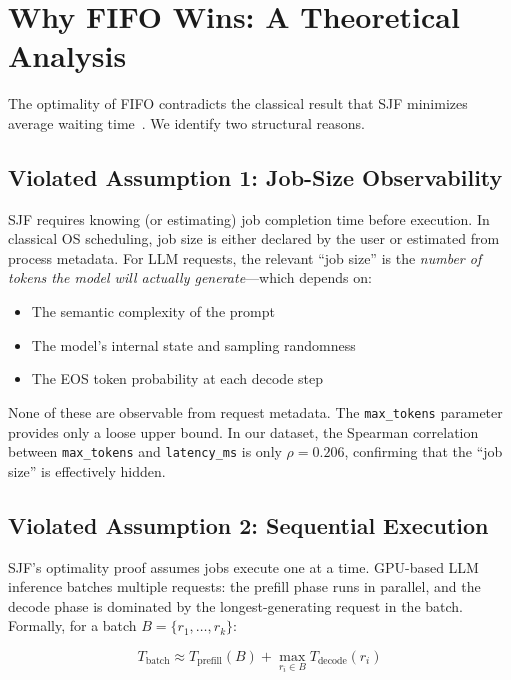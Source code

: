 \documentclass[conference]{IEEEtran}
\begin{document}
\section{Why FIFO Wins: A Theoretical Analysis}
\label{sec:why_fifo}

The optimality of FIFO contradicts the classical result that SJF minimizes average waiting time~\cite{liu1973scheduling}. We identify two structural reasons.

\subsection{Violated Assumption 1: Job-Size Observability}

SJF requires knowing (or estimating) job completion time before execution. In classical OS scheduling, job size is either declared by the user or estimated from process metadata. For LLM requests, the relevant ``job size'' is the \textit{number of tokens the model will actually generate}---which depends on:

\begin{itemize}
    \item The semantic complexity of the prompt
    \item The model's internal state and sampling randomness
    \item The EOS token probability at each decode step
\end{itemize}

None of these are observable from request metadata. The \texttt{max\_tokens} parameter provides only a loose upper bound. In our dataset, the Spearman correlation between \texttt{max\_tokens} and \texttt{latency\_ms} is only $\rho = 0.206$, confirming that the ``job size'' is effectively hidden.

\subsection{Violated Assumption 2: Sequential Execution}

SJF's optimality proof assumes jobs execute one at a time. GPU-based LLM inference batches multiple requests: the prefill phase runs in parallel, and the decode phase is dominated by the longest-generating request in the batch. Formally, for a batch $B = \{r_1, \ldots, r_k\}$:

\begin{equation}
T_{\text{batch}} \approx T_{\text{prefill}}(B) + \max_{r_i \in B} T_{\text{decode}}(r_i)
\label{eq:batch}
\end{equation}
\end{document}
